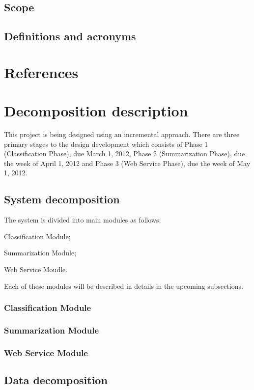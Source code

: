 \documentclass[12pt]{article}
\newenvironment{my_itemize}
{\begin{itemize}
  \setlength{\itemsep}{0cm}
  \setlength{\parskip}{0cm}}
{\end{itemize}}
\begin{document}
\subsection{Scope}
\subsection{Definitions and acronyms}

\section{References}

\section{Decomposition description}
This project is being designed using an incremental approach. There are three primary stages to the design development which consists of Phase 1 (Classification Phase), due March 1, 2012, Phase 2 (Summarization Phase), due the week of April 1, 2012 and Phase 3 (Web Service Phase), due the week of May 1, 2012.

\subsection{System decomposition}
The system is divided into main modules as follows:
\begin{my_itemize}
\item Classification Module;
\item Summarization Module;
\item Web Service Moudle.
\end{my_itemize}
Each of these modules will be described in details in the upcoming subsections.

\subsubsection{Classification Module}
\subsubsection{Summarization Module}
\subsubsection{Web Service Module}

\subsection{Data decomposition}
\end{document}
